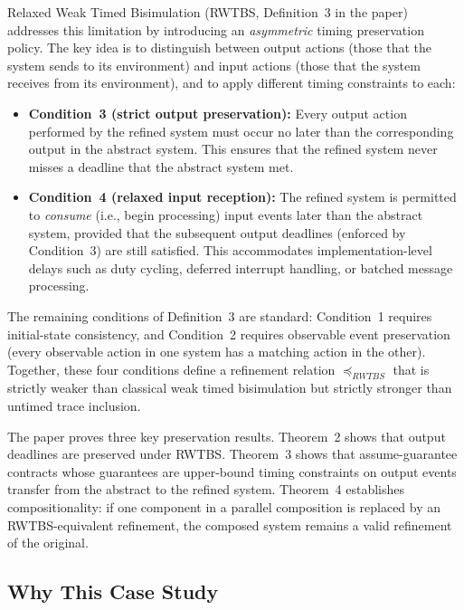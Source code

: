 \documentclass[11pt,a4paper]{article}
\newcommand{\RWTBS}{RWTBS}
\begin{document}
Relaxed Weak Timed Bisimulation (\RWTBS{}, Definition~3 in the paper)
addresses this limitation by introducing an \emph{asymmetric} timing
preservation policy.  The key idea is to distinguish between output actions
(those that the system sends to its environment) and input actions (those that
the system receives from its environment), and to apply different timing
constraints to each:

\begin{itemize}[nosep]
  \item \textbf{Condition~3 (strict output preservation):} Every output action
    performed by the refined system must occur no later than the corresponding
    output in the abstract system.  This ensures that the refined system never
    misses a deadline that the abstract system met.
  \item \textbf{Condition~4 (relaxed input reception):} The refined system is
    permitted to \emph{consume} (i.e., begin processing) input events later
    than the abstract system, provided that the subsequent output deadlines
    (enforced by Condition~3) are still satisfied.  This accommodates
    implementation-level delays such as duty cycling, deferred interrupt
    handling, or batched message processing.
\end{itemize}

\noindent
The remaining conditions of Definition~3 are standard: Condition~1 requires
initial-state consistency, and Condition~2 requires observable event
preservation (every observable action in one system has a matching action in the
other).  Together, these four conditions define a refinement relation
$\preceq_{\RWTBS{}}$ that is strictly weaker than classical weak timed
bisimulation but strictly stronger than untimed trace inclusion.

The paper proves three key preservation results.  Theorem~2 shows that output
deadlines are preserved under \RWTBS{}.  Theorem~3 shows that assume-guarantee
contracts whose guarantees are upper-bound timing constraints on output events
transfer from the abstract to the refined system.  Theorem~4 establishes
compositionality: if one component in a parallel composition is replaced by an
\RWTBS{}-equivalent refinement, the composed system remains a valid refinement
of the original.

\subsection{Why This Case Study}
\label{sec:rwtbs-why}
\end{document}
